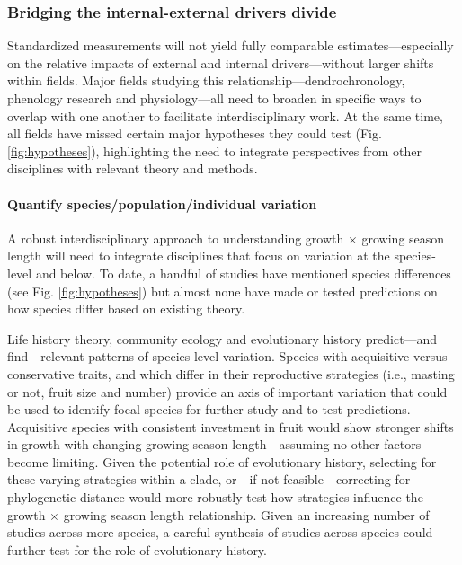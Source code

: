 \documentclass[11pt]{article}
\begin{document}
\subsubsection*{Bridging the internal-external drivers divide}

Standardized measurements will not yield fully comparable estimates---especially on the relative impacts of external and internal drivers---without larger shifts within fields. Major fields studying this relationship---dendrochronology, phenology research and physiology---all need to broaden in specific ways to overlap with one another to facilitate interdisciplinary work. At the same time, all fields have missed certain major hypotheses they could test (Fig. \ref{fig:hypotheses}), highlighting the need to integrate perspectives from other disciplines with relevant theory and methods. 

\paragraph{Quantify species/population/individual variation} 

A robust interdisciplinary approach to understanding growth $\times$ growing season length will need to integrate disciplines that focus on variation at the species-level and below. To date, a handful of studies have mentioned species differences (see Fig. \ref{fig:hypotheses}) but almost none have made or tested predictions on how species differ based on existing theory. 

Life history theory, community ecology and evolutionary history predict---and find---relevant patterns of species-level variation. Species with acquisitive versus conservative traits, and which differ in their reproductive strategies (i.e., masting or not, fruit size and number) provide an axis of important variation that could be used to identify focal species for further study and to test predictions. Acquisitive species with consistent investment in fruit would show stronger shifts in growth with changing growing season length---assuming no other factors become limiting. Given the potential role of evolutionary history, selecting for these varying strategies within a clade, or---if not feasible---correcting for phylogenetic distance would more robustly test how strategies influence the growth $\times$ growing season length relationship. Given an increasing number of studies across more species, a careful synthesis of studies across species could further test for the role of evolutionary history. 
\end{document}
